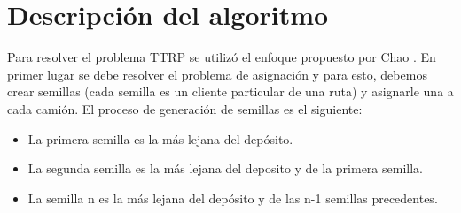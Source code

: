 \documentclass[letter, 10pt]{article}
\begin{document}
\section{Descripci\'on del algoritmo}
Para resolver el problema TTRP se utilizó el enfoque propuesto por Chao \cite{Chao}. En primer lugar se debe resolver el problema de asignación y para esto, debemos crear semillas (cada semilla es un cliente particular de una ruta) y asignarle una a cada camión. El proceso de generación de semillas es el siguiente:
\begin{itemize}
    \item La primera semilla es la más lejana del depósito.
    \item La segunda semilla es la más lejana del deposito y de la primera semilla.
    \item La semilla n es la más lejana del depósito y de las n-1 semillas precedentes.
\end{itemize}
\end{document}
